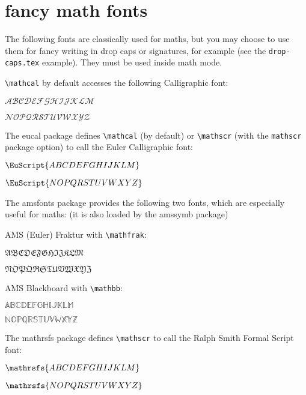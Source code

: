 \documentclass[article]{memoir}
\newcommand{\mathtest}[1]{
{\begin{flushright}\Huge$#1{ABCDEFGHIJKLM}$\par$#1{NOPQRSTUVWXYZ}$\end{flushright}}
}
\begin{document}
\chapter*{fancy math fonts}

The following fonts are classically used for maths, but you may choose to use them for fancy writing in drop caps or signatures, for example (see the \texttt{drop-caps.tex} example). They must be used inside math mode.

\verb|\mathcal| by default accesses the following Calligraphic font:
\mathtest{\mathcal}

The \textsf{eucal} package defines \verb|\mathcal| (by default) or \verb|\mathscr| (with the \texttt{mathscr} package option) to call the Euler Calligraphic font:
\mathtest{\EuScript}

The \textsf{amsfonts} package provides the following two fonts, which are especially useful for maths: (it is also loaded by the \textsf{amssymb} package)

AMS (Euler) Fraktur with \verb|\mathfrak|:
\mathtest{\mathfrak}

AMS Blackboard with \verb|\mathbb|:
\mathtest{\mathbb}

The \textsf{mathrsfs} package defines \verb|\mathscr| to call the Ralph Smith Formal Script font:
\mathtest{\mathrsfs}
\end{document}
